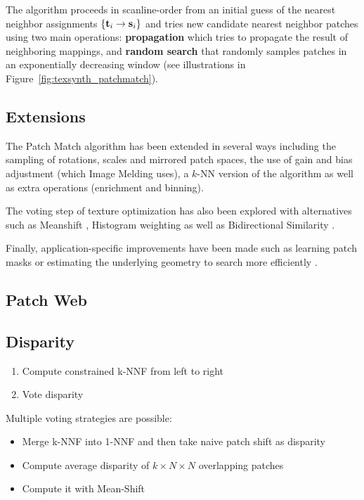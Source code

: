 The algorithm proceeds in scanline-order from an initial guess of the nearest neighbor assignments $\{\mathbf{t}_i \to \mathbf{s}_i\}$ and tries new candidate nearest neighbor patches using two main operations: \textbf{propagation} which tries to propagate the result of neighboring mappings, and \textbf{random search} that randomly samples patches in an exponentially decreasing window (see illustrations in Figure~\ref{fig:texsynth_patchmatch}).

\subsection{Extensions}

The Patch Match algorithm has been extended in several ways \cite{Barnes10} including the sampling of rotations, scales and mirrored patch spaces, the use of gain and bias adjustment (which Image Melding uses), a $k$-NN version of the algorithm as well as extra operations (enrichment and binning).

The voting step of texture optimization has also been explored with alternatives such as Meanshift \cite{Wexler07}, Histogram weighting \cite{Kopf07} as well as Bidirectional Similarity \cite{Simakov08}.

Finally, application-specific improvements have been made such as learning patch masks \cite{Kalantari14} or estimating the underlying geometry to search more efficiently \cite{Huang14}.

\subsection{Patch Web}

\subsection{Disparity}

\begin{enumerate}
	\item Compute constrained k-NNF from left to right
	\item Vote disparity
\end{enumerate}

Multiple voting strategies are possible:
\begin{itemize}
	\item Merge k-NNF into 1-NNF and then take naive patch shift as disparity
	\item Compute average disparity of $k \times N \times N$ overlapping patches
	\item Compute it with Mean-Shift
\end{itemize}




